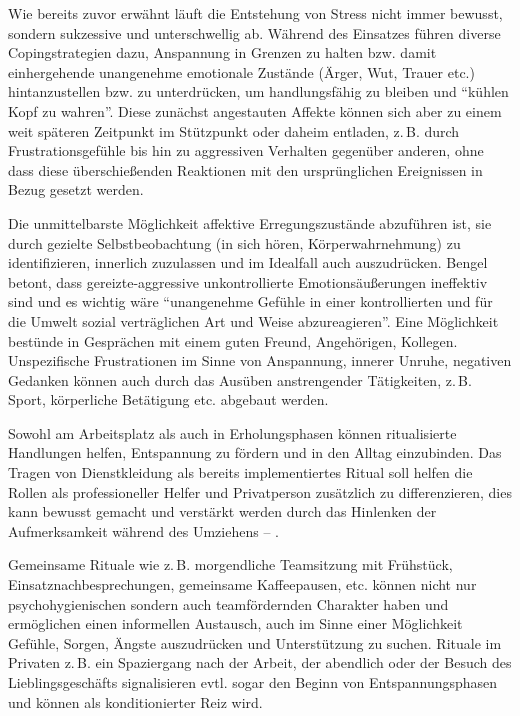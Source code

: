 {Wie
bereits zuvor erwähnt läuft die Entstehung von Stress nicht
immer bewusst, sondern sukzessive und unterschwellig ab.
Während des Einsatzes führen diverse Copingstrategien dazu,
Anspannung in Grenzen zu halten bzw. damit einhergehende
unangenehme emotionale Zustände (Ärger, Wut, Trauer etc.)
hintanzustellen bzw. zu unterdrücken, um handlungsfähig zu
bleiben und \enquote{kühlen Kopf zu wahren}. Diese zunächst
angestauten Affekte können sich aber zu einem weit späteren
Zeitpunkt im Stützpunkt oder daheim entladen, z.\,B. durch
Frustrationsgefühle bis hin zu aggressiven Verhalten
gegenüber anderen, ohne dass diese überschießenden
Reaktionen mit den ursprünglichen Ereignissen in Bezug
gesetzt werden. 

Die unmittelbarste Möglichkeit affektive
Erregungszustände abzuführen ist, sie durch gezielte
Selbstbeobachtung (in sich hören, Körperwahrnehmung) zu
identifizieren, innerlich zuzulassen und im Idealfall auch
auszudrücken. 
Bengel \cite{BengelPsyNotfallmedRd2-PsyBelRdPers} betont, dass gereizte-aggressive
unkontrollierte Emotionsäußerungen ineffektiv sind und es
wichtig wäre \enquote{unangenehme Gefühle in einer kontrollierten
und für die Umwelt sozial verträglichen Art und Weise
abzureagieren}. Eine Möglichkeit bestünde in Gesprächen mit
einem guten Freund, Angehörigen, Kollegen. Unspezifische
Frustrationen im Sinne von Anspannung, innerer Unruhe,
negativen Gedanken können auch durch das Ausüben
anstrengender Tätigkeiten, z.\,B. Sport, körperliche
Betätigung etc. abgebaut werden.}
{}
{}
{}
{}

{Sowohl am Arbeitsplatz als auch in Erholungsphasen können
ritualisierte Handlungen helfen, Entspannung zu fördern und
in den Alltag einzubinden. Das Tragen von Dienstkleidung als
bereits implementiertes Ritual soll helfen die Rollen als
professioneller Helfer und Privatperson zusätzlich zu
differenzieren, dies kann bewusst gemacht und verstärkt
werden durch das Hinlenken der Aufmerksamkeit während des
Umziehens -- . 

Gemeinsame Rituale wie z.\,B. morgendliche Teamsitzung mit
Frühstück, Einsatznachbesprechungen, gemeinsame
Kaffeepausen, etc. können nicht nur psychohygienischen
sondern auch teamfördernden Charakter haben und ermöglichen
einen informellen Austausch, auch im Sinne einer Möglichkeit
Gefühle, Sorgen, Ängste auszudrücken und Unterstützung zu
suchen. Rituale im Privaten z.\,B. ein Spaziergang nach der
Arbeit, der abendlich  oder der
Besuch des Lieblingsgeschäfts signalisieren evtl. sogar den Beginn von
Entspannungsphasen und können als konditionierter Reiz wird.}
{}
{}
{}
{}

